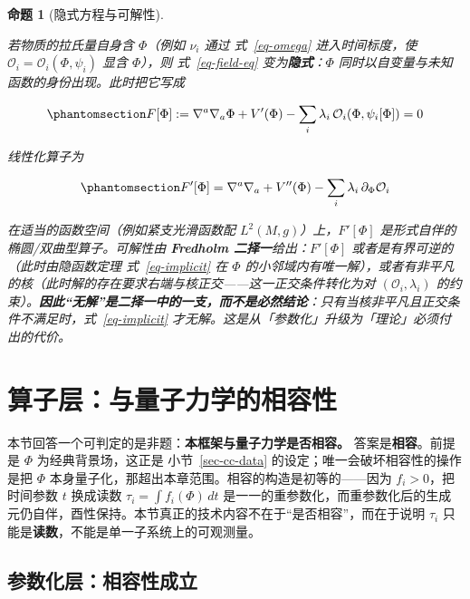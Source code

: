 \documentclass[
  chinese,
  a4paper,
  UTF8,
  12pt,
  oneside,
  openany]{ctexbook}
\theoremstyle{plain}
\theoremstyle{plain}
\theoremstyle{plain}
\newtheorem{proposition}{命题}[chapter]
\theoremstyle{definition}
\theoremstyle{plain}
\theoremstyle{plain}
\theoremstyle{remark}
\begin{document}
\begin{proposition}[隐式方程与可解性]\protect\hypertarget{prp-implicit}{}\label{prp-implicit}

若物质的拉氏量自身含 \(\Phi\)（例如 \(\nu_i\) 通过 式~\ref{eq-omega}
进入时间标度，使 \(\mathcal{O}_i=\mathcal{O}_i(\Phi,\psi_i)\) 显含
\(\Phi\)），则 式~\ref{eq-field-eq} 变为\textbf{隐式}：\(\Phi\)
同时以自变量与未知函数的身份出现。此时把它写成

\begin{equation}\protect\phantomsection\label{eq-implicit}{
F[\Phi]:=\nabla^{a}\nabla_{a}\Phi + V'(\Phi) - \sum_{i}\lambda_i\,\mathcal{O}_i(\Phi,\psi_i[\Phi])=0
}\end{equation}

线性化算子为

\begin{equation}\protect\phantomsection\label{eq-implicit-linearization}{
F'[\Phi]=\nabla^{a}\nabla_{a} + V''(\Phi) - \sum_{i}\lambda_i\,\partial_{\Phi}\mathcal{O}_i
}\end{equation}

在适当的函数空间（例如紧支光滑函数配 \(L^{2}(M,g)\)）上，\(F'[\Phi]\)
是形式自伴的椭圆/双曲型算子。可解性由 \textbf{Fredholm
二择一}给出：\(F'[\Phi]\) 或者是有界可逆的（此时由隐函数定理
式~\ref{eq-implicit} 在 \(\Phi\)
的小邻域内有唯一解），或者有非平凡的核（此时解的存在要求右端与核正交------这一正交条件转化为对
\((\mathcal{O}_i,\lambda_i)\)
的约束）。\textbf{因此``无解''是二择一中的一支，而不是必然结论}：只有当核非平凡且正交条件不满足时，式~\ref{eq-implicit}
才无解。这是从「参数化」升级为「理论」必须付出的代价。

\end{proposition}

\section{算子层：与量子力学的相容性}\label{sec-cc-quantum}

本节回答一个可判定的是非题：\textbf{本框架与量子力学是否相容。}
答案是\textbf{相容}。前提是 \(\Phi\) 为经典背景场，这正是
小节~\ref{sec-cc-data} 的设定；唯一会破坏相容性的操作是把 \(\Phi\)
本身量子化，那超出本章范围。相容的构造是初等的------因为
\(f_i>0\)，把时间参数 \(t\) 换成读数 \(\tau_i=\int f_i(\Phi)\,dt\)
是一一的重参数化，而重参数化后的生成元仍自伴，酉性保持。本节真正的技术内容不在于``是否相容''，而在于说明
\(\tau_i\) 只能是\textbf{读数}，不能是单一子系统上的可观测量。

\subsection{参数化层：相容性成立}\label{ux53c2ux6570ux5316ux5c42ux76f8ux5bb9ux6027ux6210ux7acb}
\end{document}

